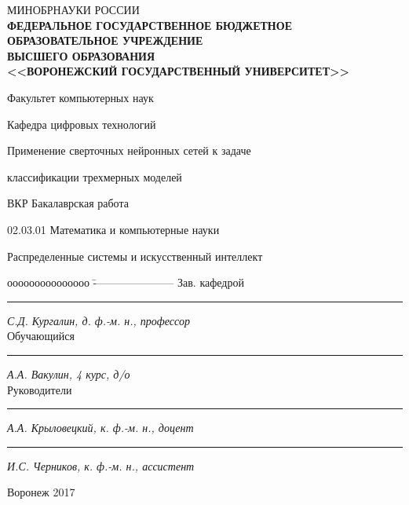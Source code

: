\documentclass[14pt]{article}
\numberwithin{figure}{section}
\numberwithin{equation}{section}
\begin{document}
\begin{titlepage}

\thispagestyle{empty}
\center
{\small МИНОБРНАУКИ РОССИИ}\\  \!  \!  \!
{\small \textbf{ФЕДЕРАЛЬНОЕ ГОСУДАРСТВЕННОЕ БЮДЖЕТНОЕ}}\\ \!  \!  \!
{\small \textbf{ОБРАЗОВАТЕЛЬНОЕ УЧРЕЖДЕНИЕ}}\\ \!  \!
{\small  \textbf{ВЫСШЕГО ОБРАЗОВАНИЯ}}\\ \!  \!
{\small \textbf{<<ВОРОНЕЖСКИЙ ГОСУДАРСТВЕННЫЙ УНИВЕРСИТЕТ>>}}\\ \!  \!

\vspace{0.3cm}

\centerline{Факультет компьютерных наук}
\centerline{Кафедра цифровых технологий}

\vspace{1cm}

\centerline{Применение сверточных нейронных сетей к задаче }
\centerline{классификации трехмерных моделей}

\vspace{1cm}

\centerline{ВКР Бакалаврская работа}
\centerline{02.03.01 Математика и компьютерные науки}
\centerline{Распределенные системы и искусственный интеллект}

\vfill
{}
\begin{tabbing}
ооооооооооооооо	\=	----------------------	\kill
Зав. кафедрой	\> 	\rule[0mm]{4cm}{0,3mm}	\textit{С.Д. Кургалин, д. ф.-м. н., профессор} \\
Обучающийся 	\> 	\rule[0mm]{4cm}{0,3mm}	\textit{А.А. Вакулин, 4 курс, д/о}             \\
Руководители	\> 	\rule[0mm]{4cm}{0,3mm}  \textit{А.А. Крыловецкий, к. ф.-м. н., доцент} \\
				\> 	\rule[0mm]{4cm}{0,3mm}  \textit{И.С. Черников, к. ф.-м. н., ассистент}
\end{tabbing}

\vfill

\centerline{Воронеж 2017}
\clearpage
\end{titlepage}
\end{document}
